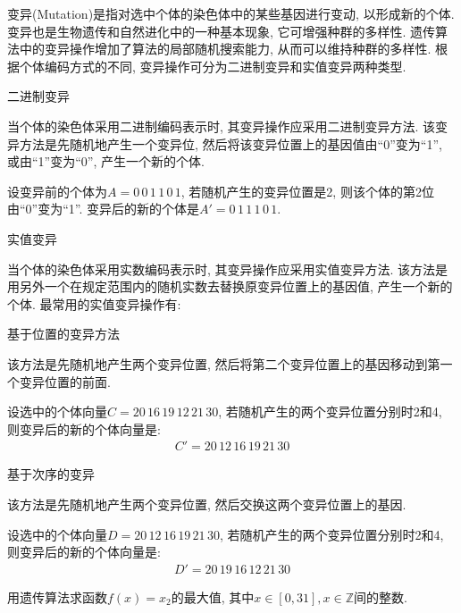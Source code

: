  变异(Mutation)是指对选中个体的染色体中的某些基因进行变动, 以形成新的个体. 变异也是生物遗传和自然进化中的一种基本现象, 它可增强种群的多样性. 遗传算法中的变异操作增加了算法的局部随机搜索能力, 从而可以维持种群的多样性. 根据个体编码方式的不同, 变异操作可分为二进制变异和实值变异两种类型.

  二进制变异

 当个体的染色体采用二进制编码表示时, 其变异操作应采用二进制变异方法. 该变异方法是先随机地产生一个变异位, 然后将该变异位置上的基因值由“0”变为“1”, 或由“1”变为“0”, 产生一个新的个体.

\begin{example}
设变异前的个体为$A=0\, 0 \, 1\,  1\,  0 \, 1$, 若随机产生的变异位置是2, 则该个体的第2位由“0”变为“1”.
变异后的新的个体是$A'= 0\,  1\,  1\,  1\,  0 \, 1$.
\end{example}

 实值变异

 当个体的染色体采用实数编码表示时, 其变异操作应采用实值变异方法. 该方法是用另外一个在规定范围内的随机实数去替换原变异位置上的基因值, 产生一个新的个体. 最常用的实值变异操作有:

 基于位置的变异方法

该方法是先随机地产生两个变异位置, 然后将第二个变异位置上的基因移动到第一个变异位置的前面.

\begin{example}
设选中的个体向量$C=20\,  16\,  19\,  12\,  21\,  30$, 若随机产生的两个变异位置分别时2和4, 则变异后的新的个体向量是:
\begin{align}
  C'= 20\,  12 \, 16 \, 19\,  21\,  30
\end{align}
\end{example}

基于次序的变异

该方法是先随机地产生两个变异位置, 然后交换这两个变异位置上的基因.

\begin{example}
设选中的个体向量$D=20\,  12 \, 16 \, 19\,  21\,  30$, 若随机产生的两个变异位置分别时2和4, 则变异后的新的个体向量是:
\begin{align}
  D'= 20\,  19\,  16\,  12 \, 21 \, 30
\end{align}
\end{example}

\begin{example}
用遗传算法求函数$f(x)=x_2$的最大值, 其中$x\in [0,31],x\in \mathbb Z$间的整数.
\end{example}

